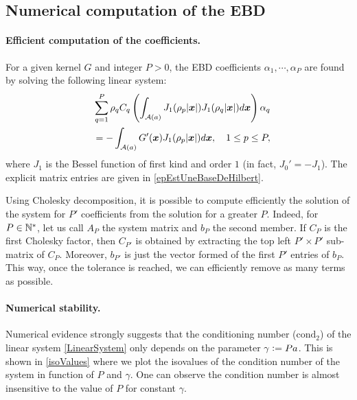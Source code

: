 \documentclass[main]{subfiles}
\begin{document}
\subsection{Numerical computation of the EBD}
\label{sub:NumStab}

\paragraph{Efficient computation of the coefficients.}					
For a given kernel $G$ and integer $P >0$, the EBD coefficients $\alpha_1,\cdots,\alpha_P$ are found by solving the following linear system: 
\begin{equation}
\begin{split}
\sum_{q = 1}^P \rho_q C_q\left(\int_{\mathcal{A}(a)} J_1(\rho_p|\boldsymbol{x}|)  J_1(\rho_q|\boldsymbol{x}|) d\boldsymbol{x}\right) \alpha_q \\
\quad = -\int_{\mathcal{A}(a)} G'(\boldsymbol{x}) J_1(\rho_p|\boldsymbol{x}|)d\boldsymbol{x}, \quad 1\leq p \leq P,
\end{split}	
\label{LinearSystem}
\end{equation}
where $J_1$ is the Bessel function of first kind and order $1$ (in fact, $J_0' = - J_1$). The explicit matrix entries are given in \autoref{epEstUneBaseDeHilbert}. 

Using Cholesky decomposition, it is possible to compute efficiently the solution of the system for $P'$ coefficients from the solution for a greater $P$. Indeed, for $P \in \mathbb{N}^*$, let us call $A_P$ the system matrix and $b_P$ the second member. If $C_P$ is the first Cholesky factor, then $C_{P'}$ is obtained by extracting the top left $P'\times P'$ sub-matrix of $C_P$. Moreover, $b_{P'}$ is just the vector formed of the first $P'$ entries of $b_P$. This way, once the tolerance is reached, we can efficiently remove as many terms as possible. 
\newcommand{\Pa}{\gamma}

\paragraph{Numerical stability.}	

Numerical evidence strongly suggests that the conditioning number ($\text{cond}_2$) of the linear system \eqref{LinearSystem} only depends on the parameter $\Pa \isdef Pa$. This is shown in \autoref{isoValues} where we plot the isovalues of the condition number of the system in function of $P$ and $\gamma$. One can observe the condition number is almost insensitive to the value of $P$ for constant $\gamma$. 
\end{document}
